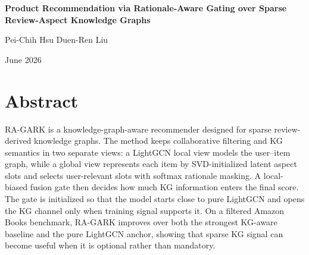 \frontmatter
{}
{\selectfont

\begin{center}
{\Large\bfseries Product Recommendation via Rationale-Aware Gating over Sparse Review-Aspect Knowledge Graphs\par}
\vspace{0.8cm}
{\large Pei-Chih Hsu \quad Duen-Ren Liu\par}
\vspace{0.4cm}
{\large June 2026\par}
\end{center}

\chapter*{Abstract}
RA-GARK is a knowledge-graph-aware recommender designed for sparse review-derived knowledge graphs. The method keeps collaborative filtering and KG semantics in two separate views: a LightGCN local view models the user--item graph, while a global view represents each item by SVD-initialized latent aspect slots and selects user-relevant slots with softmax rationale masking. A local-biased fusion gate then decides how much KG information enters the final score. The gate is initialized so that the model starts close to pure LightGCN and opens the KG channel only when training signal supports it. On a filtered Amazon Books benchmark, RA-GARK improves over both the strongest KG-aware baseline and the pure LightGCN anchor, showing that sparse KG signal can become useful when it is optional rather than mandatory.

\tableofcontents
\newpage

\mainmatter
{}
\titleformat{\chapter}{\normalfont\huge\bfseries}{\thechapter}{1em}{}
\titlespacing*{\chapter}{0pt}{18pt}{12pt}

 \newpage
 \newpage
 \newpage
 \newpage
 \newpage

\renewcommand{\bibname}{References}



}
\balance

